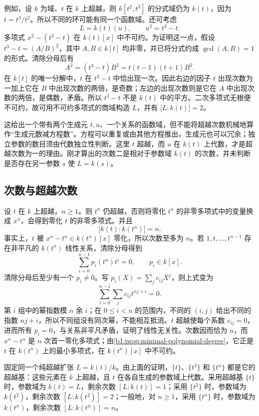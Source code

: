 \ProseParagraphBreak
例如，设 \(k\) 为域、\(t\) 在 \(k\) 上超越，则 \(k[t^2,t^3]\) 的分式域仍为 \(k(t)\)，因为 \(t=t^3/t^2\)。所以不同的环可能有同一个函数域。还可考虑
\[
	L=k(t)(u),\qquad u^2=t^3-t.
\]
多项式 \(x^2-(t^3-t)\) 在 \(k(t)[x]\) 中不可约。为证明这一点，假设 \(t^3-t=(A/B)^2\)，其中 \(A,B\in k[t]\) 均非零，并已将分式约成 \(\gcd(A,B)=1\) 的形式。清除分母后有
\[
	A^2=(t^3-t)B^2=t(t-1)(t+1)B^2.
\]
在 \(k[t]\) 的唯一分解中，\(t\) 在 \(t^3-t\) 中恰出现一次。因此右边的因子 \(t\) 出现次数为一加上它在 \(B\) 中出现次数的两倍，是奇数；左边的出现次数则是它在 \(A\) 中出现次数的两倍，是偶数，矛盾。所以 \(t^3-t\) 不是 \(k(t)\) 中的平方。二次多项式无根便不可约，故可用不可约多项式的商域构造 \(L\)，并有 \(\bigl[L:k(t)\bigr]=2\)。

\ProseParagraphBreak
这给出一个带有两个生成元 \(t,u\)、一个关系的函数域，但不能将超越次数机械地算作“生成元数减方程数”。方程可以重复或由其他方程推出，生成元也可以冗余；独立参数的数目须由代数独立性判断。这里 \(t\) 超越，而 \(u\) 在 \(k(t)\) 上代数，才是超越次数为一的理由。刚才算出的次数二是相对于参数域 \(k(t)\) 的次数，并未判断是否存在另一参数 \(s\) 使 \(L=k(s)\)。

\subsection{次数与超越次数}
\label{b1:subsec:1404:02}

设 \(t\) 在 \(k\) 上超越，\(n\geq1\)。则 \(t^n\) 仍超越，否则将零化 \(t^n\) 的非零多项式中的变量换成 \(x^n\)，会得到零化 \(t\) 的非零多项式。并且
\begin{equation}\label{b1:eq:rational-power-degree}
	\bigl[k(t):k(t^n)\bigr]=n.
\end{equation}
事实上，\(t\) 被 \(x^n-t^n\in k(t^n)[x]\) 零化，所以次数至多为 \(n\)。若 \(1,t,\ldots,t^{n-1}\) 存在非平凡的 \(k(t^n)\) 线性关系，清除分母得到
\[
	\sum_{i=0}^{n-1}p_i(t^n)t^i=0,\qquad p_i\in k[x].
\]
清除分母后至少有一个 \(p_i\ne0\)。写 \(p_i(X)=\sum_jc_{ij}X^j\)，则上式变为
\[
	\sum_{i=0}^{n-1}\sum_j c_{ij}t^{nj+i}=0.
\]
第 \(i\) 组中的幂指数模 \(n\) 余 \(i\)；在 \(0\le i<n\) 的范围内，不同的 \((i,j)\) 给出不同的指数 \(nj+i\)，所以不同组没有同次幂，不能相互抵消。\(t\) 超越使每个系数 \(c_{ij}=0\)，进而所有 \(p_i=0\)，与关系非平凡矛盾，证明了线性无关性。次数因而恰为 \(n\)，而 \(x^n-t^n\) 是 \(n\) 次首一零化多项式；由\cref{b1:prop:minimal-polynomial-degree}，它正是 \(t\) 在 \(k(t^n)\) 上的最小多项式，在 \(k(t^n)[x]\) 中不可约。

\ProseParagraphBreak
固定同一个纯超越扩张 \(L=k(t)/k\)。由上面的证明，\(\{t\}\)、\(\{t^2\}\) 和 \(\{t^n\}\) 都是它的超越基：这些元素在 \(k\) 上超越，且 \(t\) 在各自生成的参数域上代数。采用超越基 \(\{t\}\) 时，参数域为 \(k(t)=L\)，剩余次数 \([L:k(t)]=1\)；采用 \(\{t^2\}\) 时，参数域为 \(k(t^2)\)，剩余次数 \([L:k(t^2)]=2\)；一般地，对 \(n\ge1\)，采用 \(\{t^n\}\) 时，参数域为 \(k(t^n)\)，剩余次数 \([L:k(t^n)]=n\)。

